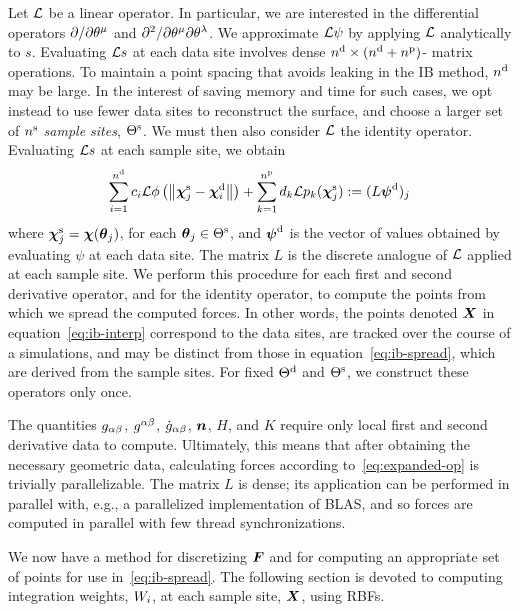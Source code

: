 Let $\mathcal{L}$ be a linear operator. In particular, we are interested in the differential
operators $\partial/\partial\q[\mu]$ and $\partial^2/\partial\q[\mu]\partial\q[\lambda]$.
We approximate $\mathcal{L}\psi$ by applying $\mathcal{L}$ analytically to $s$. Evaluating $\mathcal{L} s$ at each
data site involves dense ${n}^\text{d}\times({n}^\text{d}+{n}^\text{p})$-%
matrix operations.
To maintain a point spacing that avoids
leaking in the IB method, ${n}^\text{d}$ may be large. In the interest of saving
memory and time for such cases, we opt instead to use fewer data sites to reconstruct the
surface, and choose a larger set of ${n}^\text{s}$ \emph{sample sites},
${\Theta}^\text{s}$. We must then also consider $\mathcal{L}$ the identity operator.  Evaluating
$\mathcal{L} s$ at each sample site, we obtain
\begin{equation}
    \sum_{i=1}^{{n}^\text{d}} c_i \mathcal{L}\phi\left(\left\|{\boldsymbol{\chi}}^\text{s}_j-{\boldsymbol{\chi}}^\text{d}_i\right\|\right) +
    \sum_{k=1}^{{n}^\text{p}} d_k \mathcal{L} p_k({\boldsymbol{\chi}}^\text{s}_j) := (L {\boldsymbol{\psi}}^\text{d})_j
\end{equation}
where ${\boldsymbol{\chi}}^\text{s}_j = \boldsymbol{\chi}(\boldsymbol{\theta}_j)$, for each $\boldsymbol{\theta}_j\in{\ensuremath{\Theta}}^\text{s}$, and
${\boldsymbol{\psi}}^\text{d}$ is the vector of values obtained by evaluating $\psi$ at each data
site. The matrix $L$ is the discrete analogue of $\mathcal{L}$ applied at each sample site. We
perform this procedure for each first and second derivative operator, and for the
identity operator, to compute the points from which we spread the computed forces. In
other words, the points denoted $\boldsymbol{X}$ in equation~\eqref{eq:ib-interp} correspond to the
data sites, are tracked over the course of a simulations, and may be distinct from those
in equation~\eqref{eq:ib-spread}, which are derived from the sample sites. For fixed
${\Theta}^\text{d}$ and ${\Theta}^\text{s}$, we construct these operators only once.

The quantities $g_{\alpha\beta}$, $g^{\alpha\beta}$,
$\dot{g}_{\alpha\beta}$, $\boldsymbol{n}$, $H$, and $K$ require only local first and second
derivative data to compute. Ultimately, this means that after obtaining the necessary
geometric data, calculating forces according to~\eqref{eq:expanded-op} is trivially
parallelizable. The matrix $L$ is dense; its application can be performed in parallel
with, e.g., a parallelized implementation of BLAS, and so forces are computed in parallel
with few thread synchronizations.

We now have a method for discretizing $\boldsymbol{F}$ and for computing an appropriate set of points
for use in~\eqref{eq:ib-spread}. The following section is devoted to computing
integration weights, $\weight[i]$, at each sample site, $\boldsymbol{X}$, using RBFs.
